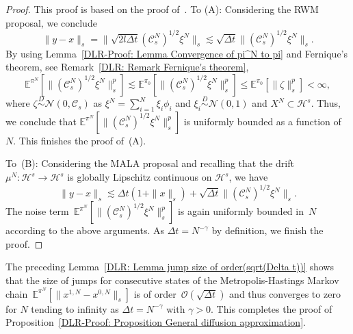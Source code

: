 \begin{proof}
  This proof is based on the proof of~\autocite[Lemma 4.2]{Pillai2012}. To (A): Considering the RWM proposal, we conclude
   \begin{equation*}
      \| y - x \|_s  = \| \sqrt{2l \Delta t} (\mathcal{C}_s^N)^{1/2} \xi^N \|_s  \lesssim \sqrt{\Delta t} \|  (\mathcal{C}_s^N)^{1/2} \xi^N \|_s.
   \end{equation*}
   By using Lemma~\ref{DLR-Proof: Lemma Convergence of pi^N to pi} and Fernique's theorem, see Remark~\ref{DLR: Remark Fernique's theorem},
   \begin{equation*}
     \mathbb{E}^{\pi^N}[\|  (\mathcal{C}_s^N)^{1/2} \xi^N \|_s^p] \lesssim \mathbb{E}^{\pi_0}[\|  (\mathcal{C}_s^N)^{1/2} \xi^N \|_s^p] \leq \mathbb{E}^{\pi_0} [\|  \zeta \|_s^p] < \infty,
   \end{equation*}
   where $\zeta \stackrel{D}{\sim} \mathcal{N}(0, \mathcal{C}_s)$ as $\xi^{N} = \sum_{i=1}^{N} \xi_i \phi_i$ and $\xi_i \stackrel{D}{\sim} \mathcal{N}(0,1)$ and $X^N \subset \mathcal{H}^s$. Thus, we conclude that $\mathbb{E}^{\pi^N}[\|  (\mathcal{C}_s^N)^{1/2} \xi^N \|_s^p]$ is uniformly bounded as a function of $N$. This finishes the proof of~(A).
   
   To~(B): Considering the MALA proposal and recalling that the drift~$\mu^N: \mathcal{H}^s \to \mathcal{H}^s$ is globally Lipschitz continuous on $\mathcal{H}^s$, we have
   \begin{equation*}
     \| y - x \|_s    \lesssim \Delta t ( 1 + \| x \|_s) + \sqrt{\Delta t} \|  (\mathcal{C}_s^N)^{1/2} \xi^N \|_s.
   \end{equation*}
   The noise term~$\mathbb{E}^{\pi^N}[\|  (\mathcal{C}_s^N)^{1/2} \xi^N \|_s^p]$ is again uniformly bounded in~$N$ according to the above arguments. As $\Delta t = N^{-\gamma}$ by definition, we finish the proof.

\end{proof}

\begin{rem}
  The preceding Lemma~\ref{DLR: Lemma jump size of order(sqrt(Delta t))} shows that the size of jumps for consecutive states of the Metropolis-Hastings Markov chain~$\mathbb{E}^{\pi^N} [ \| x^{1,N} -x^{0,N} \|_s ]$ is of order~$\mathcal{O}(\sqrt{\Delta t})$ and thus converges to zero for $N$ tending to infinity as $\Delta t = N^{-\gamma}$ with $\gamma >0$. This completes the proof of Proposition~\ref{DLR-Proof: Proposition General diffusion approximation}.
\end{rem}


